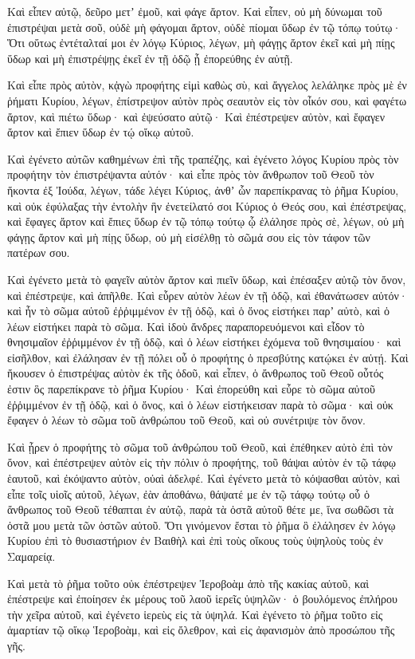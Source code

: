 {Καὶ εἶπεν αὐτῷ, δεῦρο μετʼ ἐμοῦ, καὶ φάγε ἄρτον.
Καὶ εἶπεν, οὐ μὴ δύνωμαι τοῦ ἐπιστρέψαι μετὰ σοῦ, οὐδὲ μὴ φάγομαι ἄρτον, οὐδὲ πίομαι ὕδωρ ἐν τῷ τόπῳ τούτῳ·
Ὅτι οὕτως ἐντέταλταί μοι ἐν λόγῳ Κύριος, λέγων, μὴ φάγῃς ἄρτον ἐκεῖ καὶ μὴ πίῃς ὕδωρ καὶ μὴ ἐπιστρέψῃς ἐκεῖ ἐν τῇ ὁδῷ ᾗ ἐπορεύθης ἐν αὐτῇ.
\par }{\PP {}Καὶ εἶπε πρὸς αὐτὸν, κᾀγὼ προφήτης εἰμὶ καθὼς σὺ, καὶ ἄγγελος λελάληκε πρὸς μὲ ἐν ῥήματι Κυρίου, λέγων, ἐπίστρεψον αὐτὸν πρὸς σεαυτὸν εἰς τὸν οἶκόν σου, καὶ φαγέτω ἄρτον, καὶ πιέτω ὕδωρ· καὶ ἐψεύσατο αὐτῷ·
Καὶ ἐπέστρεψεν αὐτὸν, καὶ ἔφαγεν ἄρτον καὶ ἔπιεν ὕδωρ ἐν τῴ οἴκῳ αὐτοῦ.
\par }{\PP {}Καὶ ἐγένετο αὐτῶν καθημένων ἐπὶ τῆς τραπέζης, καὶ ἐγένετο λόγος Κυρίου πρὸς τὸν προφήτην τὸν ἐπιστρέψαντα αὐτόν·
καὶ εἶπε πρὸς τὸν ἄνθρωπον τοῦ Θεοῦ τὸν ἥκοντα ἐξ Ἰούδα, λέγων, τάδε λέγει Κύριος, ἀνθʼ ὧν παρεπίκρανας τὸ ῥῆμα Κυρίου, καὶ οὐκ ἐφύλαξας τὴν ἐντολὴν ἣν ἐνετείλατό σοι Κύριος ὁ Θεός σου,
καὶ ἐπέστρεψας, καὶ ἔφαγες ἄρτον καὶ ἔπιες ὕδωρ ἐν τῷ τόπῳ τούτῳ ᾧ ἐλάλησε πρὸς σὲ, λέγων, οὐ μὴ φάγῃς ἄρτον καὶ μὴ πίῃς ὕδωρ, οὐ μὴ εἰσέλθῃ τὸ σῶμά σου εἰς τὸν τάφον τῶν πατέρων σου.
\par }{\PP {}Καὶ ἐγένετο μετὰ τὸ φαγεῖν αὐτὸν ἄρτον καὶ πιεῖν ὕδωρ, καὶ ἐπέσαξεν αὐτῷ τὸν ὄνον, καὶ ἐπέστρεψε, καὶ ἀπῆλθε.
Καὶ εὗρεν αὐτὸν λέων ἐν τῇ ὁδῷ, καὶ ἐθανάτωσεν αὐτόν· καὶ ἦν τὸ σῶμα αὐτοῦ ἐῥῥιμμένον ἐν τῇ ὁδῷ, καὶ ὁ ὄνος εἱστήκει παρʼ αὐτὸ, καὶ ὁ λέων εἱστήκει παρὰ τὸ σῶμα.
Καὶ ἰδοὺ ἄνδρες παραπορευόμενοι καὶ εἶδον τὸ θνησιμαῖον ἐῤῥιμμένον ἐν τῇ ὁδῷ, καὶ ὁ λέων εἱστήκει ἐχόμενα τοῦ θνησιμαίου· καὶ εἰσῆλθον, καὶ ἐλάλησαν ἐν τῇ πόλει οὗ ὁ προφήτης ὁ πρεσβύτης κατῴκει ἐν αὐτῄ.
Καὶ ἤκουσεν ὁ ἐπιστρέψας αὐτὸν ἐκ τῆς ὁδοῦ, καὶ εἶπεν, ὁ ἄνθρωπος τοῦ Θεοῦ οὗτός ἐστιν ὃς παρεπίκρανε τὸ ῥῆμα Κυρίου·
Καὶ ἐπορεύθη καὶ εὗρε τὸ σῶμα αὐτοῦ ἐῤῥιμμένον ἐν τῇ ὁδῷ, καὶ ὁ ὄνος, καὶ ὁ λέων εἱστήκεισαν παρὰ τὸ σῶμα· καὶ οὐκ ἔφαγεν ὁ λέων τὸ σῶμα τοῦ ἀνθρώπου τοῦ Θεοῦ, καὶ οὐ συνέτριψε τὸν ὄνον.
\par }{\PP {}Καὶ ᾖρεν ὁ προφήτης τὸ σῶμα τοῦ ἀνθρώπου τοῦ Θεοῦ, καὶ ἐπέθηκεν αὐτὸ ἐπὶ τὸν ὄνον, καὶ ἐπέστρεψεν αὐτὸν εἰς τὴν πόλιν
ὁ προφήτης, τοῦ θάψαι αὐτὸν ἐν τῷ τάφῳ ἑαυτοῦ, καὶ ἐκόψαντο αὐτὸν, οὐαὶ ἀδελφέ.
Καὶ ἐγένετο μετὰ τὸ κόψασθαι αὐτὸν, καὶ εἶπε τοῖς υἱοῖς αὐτοῦ, λέγων, ἐὰν ἀποθάνω, θάψατέ με ἐν τῷ τάφῳ τούτῳ οὗ ὁ ἄνθρωπος τοῦ Θεοῦ τέθαπται ἐν αὐτῷ, παρὰ τὰ ὀστᾶ αὐτοῦ θέτε με, ἵνα σωθῶσι τὰ ὀστᾶ μου μετὰ τῶν ὀστῶν αὐτοῦ.
Ὅτι γινόμενον ἔσται τὸ ῥῆμα ὃ ἐλάλησεν ἐν λόγῳ Κυρίου ἐπὶ τὸ θυσιαστήριον ἐν Βαιθὴλ καὶ ἐπὶ τοὺς οἴκους τοὺς ὑψηλοὺς τοὺς ἐν Σαμαρείᾳ.
\par }{\PP {}Καὶ μετὰ τὸ ῥῆμα τοῦτο οὐκ ἐπέστρεψεν Ἱεροβοὰμ ἀπὸ τῆς κακίας αὐτοῦ, καὶ ἐπέστρεψε καὶ ἐποίησεν ἐκ μέρους τοῦ λαοῦ ἱερεῖς ὑψηλῶν· ὁ βουλόμενος ἐπλήρου τὴν χεῖρα αὐτοῦ, καὶ ἐγένετο ἱερεὺς εἰς τὰ ὑψηλά.
Καὶ ἐγένετο τὸ ῥῆμα τοῦτο εἰς ἁμαρτίαν τῷ οἴκῳ Ἱεροβοὰμ, καὶ εἰς ὄλεθρον, καὶ εἰς ἀφανισμὸν ἀπὸ προσώπου τῆς γῆς.

}
